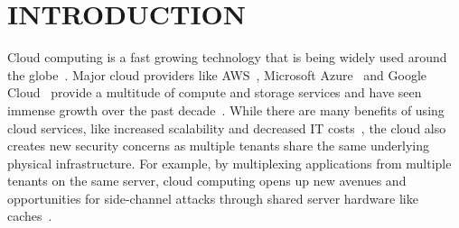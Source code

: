 \section{INTRODUCTION}
\label{sec:intro}



Cloud computing is a fast growing technology that is being widely used around
the globe~.
Major cloud providers like AWS~\cite{awscloud}, Microsoft
Azure~\cite{azurecloud} and Google Cloud~\cite{googlecloud} provide a multitude
of compute and storage services and have seen immense growth over the past
decade~. While there are many benefits of using cloud services, like
increased scalability and decreased IT costs~\cite{Armbrust}, the cloud also
creates new security concerns as multiple tenants share the same underlying
physical infrastructure. For example, by multiplexing applications from
multiple tenants on the same server, cloud computing opens up new avenues and
opportunities for side-channel attacks through shared server hardware like
caches~\cite{meltdown, xuccsw2011}.  




